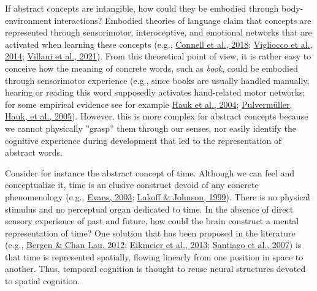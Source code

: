 \documentclass[
  a4paper,12pt,twoside,onecolumn,openright,final,oldfontcommands]{memoir}
\begin{document}
If abstract concepts are intangible, how could they be embodied through body-environment interactions? Embodied theories of language claim that concepts are represented through sensorimotor, interoceptive, and emotional networks that are activated when learning these concepts (e.g., \protect\hyperlink{ref-connell_interoception_2018}{Connell et al., 2018}; \protect\hyperlink{ref-vigliocco_neural_2014}{Vigliocco et al., 2014}; \protect\hyperlink{ref-villani_sensorimotor_2021}{Villani et al., 2021}). From this theoretical point of view, it is rather easy to conceive how the meaning of concrete words, such as \emph{book}, could be embodied through sensorimotor experience (e.g., since books are usually handled manually, hearing or reading this word supposedly activates hand-related motor networks; for some empirical evidence see for example \protect\hyperlink{ref-hauk_somatotopic_2004}{Hauk et al., 2004}; \protect\hyperlink{ref-pulvermuller_functional_2005}{Pulvermüller, Hauk, et al., 2005}). However, this is more complex for abstract concepts because we cannot physically ''grasp'' them through our senses, nor easily identify the cognitive experience during development that led to the representation of abstract words.

Consider for instance the abstract concept of time. Although we can feel and conceptualize it, time is an elusive construct devoid of any concrete phenomenology (e.g., \protect\hyperlink{ref-evans_structure_2003}{Evans, 2003}; \protect\hyperlink{ref-lakoff_philosophy_1999}{Lakoff \& Johnson, 1999}). There is no physical stimulus and no perceptual organ dedicated to time. In the absence of direct sensory experience of past and future, how could the brain construct a mental representation of time? One solution that has been proposed in the literature (e.g., \protect\hyperlink{ref-bergen_writing_2012}{Bergen \& Chan Lau, 2012}; \protect\hyperlink{ref-eikmeier_dimensional_2013}{Eikmeier et al., 2013}; \protect\hyperlink{ref-santiago_time_2007}{Santiago et al., 2007}) is that time is represented spatially, flowing linearly from one position in space to another. Thus, temporal cognition is thought to reuse neural structures devoted to spatial cognition.
\end{document}
